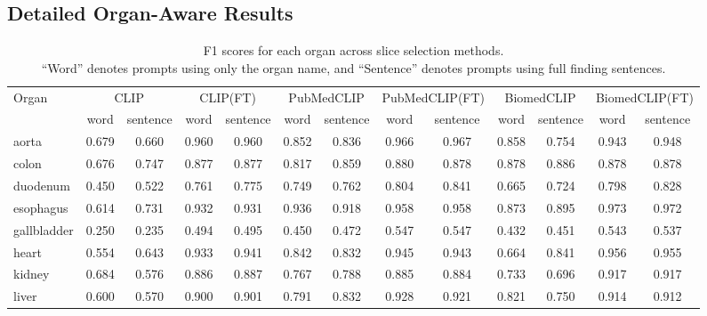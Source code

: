 \documentclass[bioengineering,article,submit,pdftex,moreauthors]{Definitions/mdpi}
\begin{document}
\clearpage
\begin{landscape}


\section{Detailed Organ-Aware Results}\label{app:organ_aware_details}


\begin{table}[ht]
  \centering
  \caption{F1 scores for each organ across slice selection methods. \\
  “Word” denotes prompts using only the organ name, 
  and “Sentence” denotes prompts using full finding sentences.}
  \label{tab:organ_f1_comparison}
  \footnotesize
  \begin{tabular}{l*{6}{cc}}
    \toprule
    Organ
      & \multicolumn{2}{c}{CLIP}
      & \multicolumn{2}{c}{CLIP(FT)}
      & \multicolumn{2}{c}{PubMedCLIP}
      & \multicolumn{2}{c}{PubMedCLIP(FT)}
      & \multicolumn{2}{c}{BiomedCLIP}
      & \multicolumn{2}{c}{BiomedCLIP(FT)} \\
    \cmidrule(lr){2-3}\cmidrule(lr){4-5}\cmidrule(lr){6-7}%
    \cmidrule(lr){8-9}\cmidrule(lr){10-11}\cmidrule(lr){12-13}
      & word & sentence
      & word & sentence
      & word & sentence
      & word & sentence
      & word & sentence
      & word & sentence \\
    \midrule
    aorta             & 0.679 & 0.660 & 0.960 & 0.960 & 0.852 & 0.836 & 0.966 & 0.967 & 0.858 & 0.754 & 0.943 & 0.948 \\
    colon             & 0.676 & 0.747 & 0.877 & 0.877 & 0.817 & 0.859 & 0.880 & 0.878 & 0.878 & 0.886 & 0.878 & 0.878 \\
    duodenum          & 0.450 & 0.522 & 0.761 & 0.775 & 0.749 & 0.762 & 0.804 & 0.841 & 0.665 & 0.724 & 0.798 & 0.828 \\
    esophagus         & 0.614 & 0.731 & 0.932 & 0.931 & 0.936 & 0.918 & 0.958 & 0.958 & 0.873 & 0.895 & 0.973 & 0.972 \\
    gallbladder       & 0.250 & 0.235 & 0.494 & 0.495 & 0.450 & 0.472 & 0.547 & 0.547 & 0.432 & 0.451 & 0.543 & 0.537 \\
    heart             & 0.554 & 0.643 & 0.933 & 0.941 & 0.842 & 0.832 & 0.945 & 0.943 & 0.664 & 0.841 & 0.956 & 0.955 \\
    kidney            & 0.684 & 0.576 & 0.886 & 0.887 & 0.767 & 0.788 & 0.885 & 0.884 & 0.733 & 0.696 & 0.917 & 0.917 \\
    liver             & 0.600 & 0.570 & 0.900 & 0.901 & 0.791 & 0.832 & 0.928 & 0.921 & 0.821 & 0.750 & 0.914 & 0.912 \\

\end{tabular}
\end{table}
\end{landscape}
\end{document}
